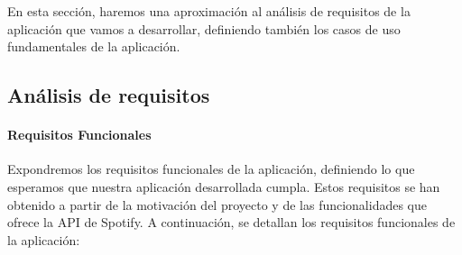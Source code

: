 En esta sección, haremos una aproximación al análisis de requisitos de la aplicación que vamos a desarrollar, definiendo
también los casos de uso fundamentales de la aplicación.

\subsection{Análisis de requisitos\label{SEC:REQUISITOS}}

\paragraph{\textbf{Requisitos Funcionales}}

Expondremos los requisitos funcionales de la aplicación, definiendo lo que esperamos que nuestra aplicación desarrollada 
cumpla. Estos requisitos se han obtenido a partir de la motivación del proyecto y de las funcionalidades que ofrece la API
de Spotify. A continuación, se detallan los requisitos funcionales de la aplicación:

